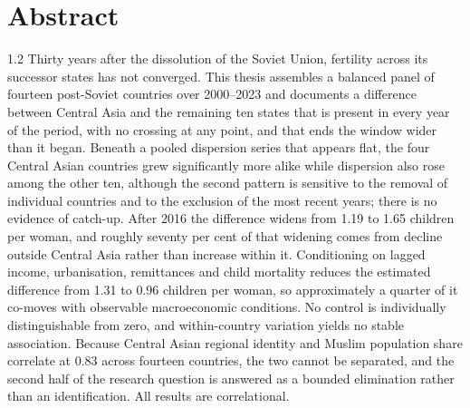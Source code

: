 \documentclass[11pt, a4paper]{article}
\begin{document}
\section*{Abstract}
\begin{spacing}{1.2}
\noindent
Thirty years after the dissolution of the Soviet Union, fertility across its successor
states has not converged. This thesis assembles a balanced panel of fourteen post-Soviet
countries over 2000--2023 and documents a difference between Central Asia and the
remaining ten states that is present in every year of the period, with no crossing at any
point, and that ends the window wider than it began. Beneath a pooled dispersion series
that appears flat, the four Central Asian countries grew significantly more alike while
dispersion also rose among the other ten, although the second pattern is sensitive to the
removal of individual countries and to the exclusion of the most recent years; there is no
evidence of catch-up. After 2016 the
difference widens from 1.19 to 1.65 children per woman, and roughly seventy per cent of
that widening comes from decline outside Central Asia rather than increase within it.
Conditioning on lagged income, urbanisation, remittances and child mortality reduces the
estimated difference from 1.31 to 0.96 children per woman, so approximately a quarter of
it co-moves with observable macroeconomic conditions. No control is individually
distinguishable from zero, and within-country variation yields no stable association.
Because Central Asian regional identity and Muslim population share correlate at 0.83
across fourteen countries, the two cannot be separated, and the second half of the research
question is answered as a bounded elimination rather than an identification. All results
are correlational.
\end{spacing}
\newpage

\tableofcontents
\newpage
{}









\end{document}
